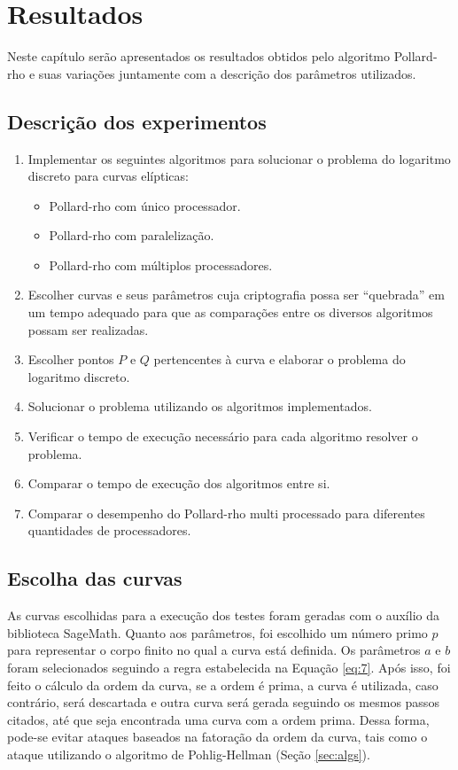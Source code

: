 \chapter{Resultados}
Neste capítulo serão apresentados os resultados obtidos pelo algoritmo Pollard-rho e suas variações juntamente com a descrição dos parâmetros utilizados.

\section{Descrição dos experimentos}
\begin{enumerate}

\item Implementar os seguintes algoritmos para solucionar o problema do logaritmo discreto para curvas elípticas:
  \begin{itemize}
  \item Pollard-rho com único processador.
  \item Pollard-rho com paralelização.
  \item Pollard-rho com múltiplos processadores.
  \end{itemize}
\item Escolher curvas e seus parâmetros cuja criptografia possa ser ``quebrada'' em um tempo adequado para que as comparações entre os diversos algoritmos possam ser realizadas.
\item Escolher pontos \(P\) e \(Q\) pertencentes à curva e elaborar o problema do logaritmo discreto.
\item Solucionar o problema utilizando os algoritmos implementados.
\item Verificar o tempo de execução necessário para cada algoritmo resolver o problema.
\item Comparar o tempo de execução dos algoritmos entre si.
\item Comparar o desempenho do Pollard-rho multi processado para diferentes quantidades de processadores.

\end{enumerate}

\section{Escolha das curvas}
As curvas escolhidas para a execução dos testes foram geradas com o auxílio da biblioteca SageMath. Quanto aos parâmetros, foi escolhido um número primo \(p\) para representar o corpo finito no qual a curva está definida. Os parâmetros \(a\) e \(b\) foram selecionados seguindo a regra estabelecida na Equação \ref{eq:7}. Após isso, foi feito o cálculo da ordem da curva, se a ordem é prima, a curva é utilizada, caso contrário, será descartada e outra curva será gerada seguindo os mesmos passos citados, até que seja encontrada uma curva com a ordem prima. Dessa forma, pode-se evitar ataques baseados na fatoração da ordem da curva, tais como o ataque utilizando o algoritmo de Pohlig-Hellman (Seção \ref{sec:algs}).

